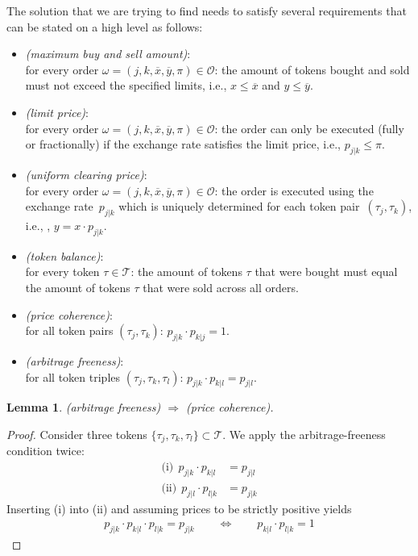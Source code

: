 \documentclass[11pt,parskip=full]{scrartcl}%
\newcommand*{\ie}{i.e., }
\newcommand*{\tokens}{\mathcal{T}}          %
\newcommand*{\orders}{\mathcal{O}}          %
\newtheorem{lemma}[theorem]{Lemma}
\begin{document}
The solution that we are trying to find needs to satisfy several requirements that can be stated on a high level as follows:
\begin{itemize}
  \item \emph{(maximum buy and sell amount)}:\\
  for every order $\omega = (j,k,\overline{x},\overline{y},\pi) \in \orders$:
  the amount of tokens bought and sold must not exceed the specified limits, \ie $x \le \overline{x}$ and $y \le \overline{y}$.
  \item \emph{(limit price)}:\\
  for every order $\omega = (j,k,\overline{x},\overline{y},\pi) \in \orders$:
  the order can only be executed (fully or fractionally) if the exchange rate satisfies the limit price, \ie $ p_{j|k} \le \pi $.
  \item \emph{(uniform clearing price)}:\\
  for every order $\omega = (j,k,\overline{x},\overline{y},\pi) \in \orders$:
  the order is executed using the exchange rate~$p_{j|k}$ which is uniquely determined for each token pair~$(\tau_j,\tau_k)$, \ie, $y = x \cdot p_{j|k}$.
  \item \emph{(token balance)}:\\
  for every token $ \tau \in \tokens $: 
  the amount of tokens $ \tau $ that were bought must equal the amount of tokens $ \tau $ that were sold across all orders.
  \item \emph{(price coherence)}:\\
  for all token pairs $ (\tau_j,\tau_k) $: $ p_{j|k} \cdot p_{k|j} = 1 $.
  \item \emph{(arbitrage freeness)}:\\
  for all token triples $ (\tau_j,\tau_k,\tau_l) $: $ p_{j|k} \cdot p_{k|l} = p_{j|l} $.
\end{itemize}

\vspace{.8cm}
\begin{lemma}
  (arbitrage freeness) $ \Rightarrow $ (price coherence).
\end{lemma}
\vspace{-.8cm}
\begin{proof}
  Consider three tokens $ \{\tau_j,\tau_k,\tau_l\} \subset \tokens $.
  We apply the arbitrage-freeness condition twice:
  \begin{align*}
    \text{(i)}  \>\> p_{j|k} \cdot p_{k|l} &= p_{j|l} \\
    \text{(ii)} \>\> p_{j|l} \cdot p_{l|k} &= p_{j|k}
  \end{align*}
  Inserting (i) into (ii) and assuming prices to be strictly positive yields
  \begin{align*}
    p_{j|k} \cdot p_{k|l} \cdot p_{l|k} = p_{j|k}
    \qquad \Leftrightarrow \qquad
    p_{k|l} \cdot p_{l|k} = 1
  \end{align*}
\end{proof}
\vspace{-.4cm}
\end{document}
